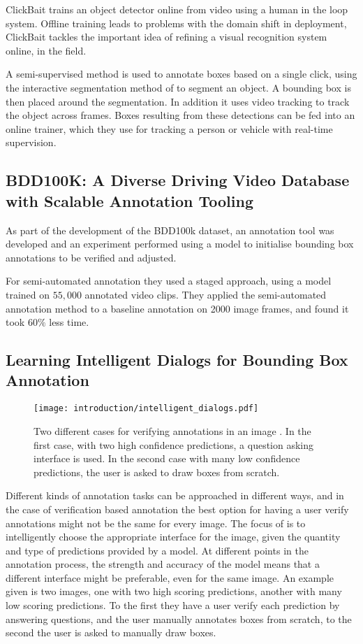 ClickBait trains an object detector online from video using a human in the loop system. Offline training leads to problems with the domain shift in deployment, ClickBait tackles the important idea of refining a visual recognition system online, in the field.

A semi-supervised method is used to annotate boxes based on a single click, using the interactive segmentation method of \cite{Xu2016} to segment an object. A bounding box is then placed around the segmentation. In addition it uses video tracking to track the object across frames. Boxes resulting from these detections can be fed into an online trainer, which they use for tracking a person or vehicle with real-time supervision.


\subsection{BDD100K: A Diverse Driving Video Database with
Scalable Annotation Tooling \cite{Yu2018a}}

As part of the development of the BDD100k dataset, an annotation tool was developed and an experiment performed using a model to initialise bounding box annotations to be verified and adjusted. 

For semi-automated annotation they used a staged approach, using a model trained on $55,000$ annotated video clips. They applied the semi-automated annotation method to a baseline annotation on 2000 image frames, and found it took $60\%$ less time.

\subsection{Learning Intelligent Dialogs for Bounding Box Annotation}

\begin{figure}[h]
  \centering
  \texttt{[image: introduction/intelligent\_dialogs.pdf]}
  \caption{Two different cases for verifying annotations in an image \cite{Konyushkova2017}. In the first case, with two high confidence predictions, a question asking interface is used. In the second case with many low confidence predictions, the user is asked to draw boxes from scratch. }
  \label{fig:intelligent_dialogs}
\end{figure}

Different kinds of annotation tasks can be approached in different ways, and in the case of verification based annotation the best option for having a user verify annotations might not be the same for every image. The focus of \cite{Konyushkova2017} is to intelligently choose the appropriate interface for the image, given the quantity and type of predictions provided by a model. At different points in the annotation process, the strength and accuracy of the model means that a different interface might be preferable, even for the same image. An example given is two images, one with two high scoring predictions, another with many low scoring predictions. To the first they have a user  verify each prediction by answering questions, and the user manually annotates boxes from scratch, to the second the user is asked to manually draw boxes. 


